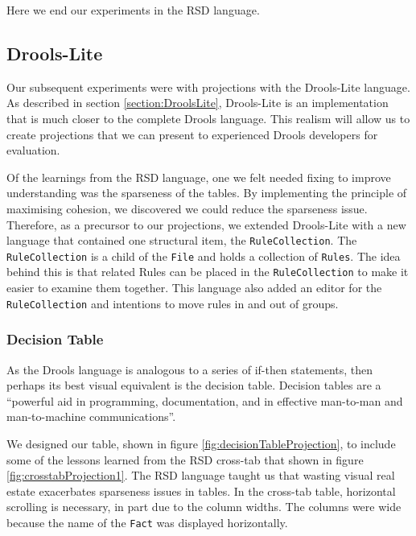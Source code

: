 Here we end our experiments in the RSD language.

\subsection{Drools-Lite}

Our subsequent experiments were with projections with the Drools-Lite language.
As described in section \ref{section:DroolsLite}, Drools-Lite is an implementation that is much closer to the complete Drools language.
This realism will allow us to create projections that we can present to experienced Drools developers for evaluation.

Of the learnings from the RSD language, one we felt needed fixing to improve understanding was the sparseness of the tables.
By implementing the principle of maximising cohesion, we discovered we could reduce the sparseness issue.
Therefore, as a precursor to our projections, we extended Drools-Lite with a new language that contained one structural item, the \texttt{RuleCollection}.
The \texttt{RuleCollection} is a child of the \texttt{File} and holds a collection of \texttt{Rules}.
The idea behind this is that related Rules can be placed in the \texttt{RuleCollection} to make it easier to examine them together.
This language also added an editor for the \texttt{RuleCollection} and intentions to move rules in and out of groups.

\subsubsection{Decision Table}

As the Drools language is analogous to a series of if-then statements, then perhaps its best visual equivalent is the decision table.
Decision tables are a ``powerful aid in programming, documentation, and in effective man-to-man and man-to-machine communications''\cite{pooch1974translation}.

We designed our table, shown in figure \ref{fig:decisionTableProjection}, to include some of the lessons learned from the RSD cross-tab that shown in figure \ref{fig:crosstabProjection1}.
The RSD language taught us that wasting visual real estate exacerbates sparseness issues in tables.
In the cross-tab table, horizontal scrolling is necessary, in part due to the column widths.
The columns were wide because the name of the \texttt{Fact} was displayed horizontally.

